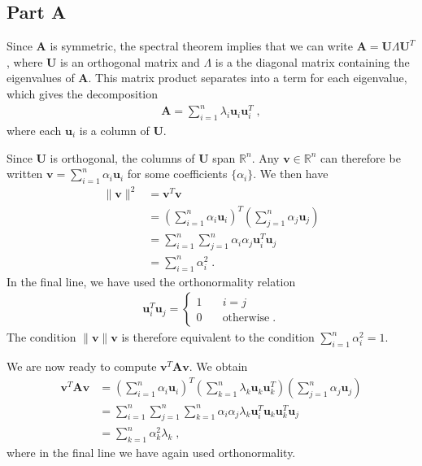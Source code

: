 \documentclass[11pt]{article}
\begin{document}

\subsection*{Part A}

Since $\mathbf{A}$ is symmetric, the spectral theorem implies that we can write $\mathbf{A} = \mathbf{U}\Lambda \mathbf{U}^T$, where $\mathbf{U}$ is an orthogonal matrix and $\Lambda$ is a the diagonal matrix containing the eigenvalues of $\mathbf{A}$. This matrix product separates into a term for each eigenvalue, which gives the decomposition
\begin{align*}
    \mathbf{A} = \sum_{i = 1}^n \lambda_i\mathbf{u}_i\mathbf{u}_i^T\;,
\end{align*}
where each $\mathbf{u}_i$ is a column of $\mathbf{U}$. 

Since $\mathbf{U}$ is orthogonal, the columns of $\mathbf{U}$ span $\mathbb{R}^n$. 
Any $\mathbf{v} \in \mathbb{R}^n$ can therefore be written $\mathbf{v} = \sum_{i = 1}^n \alpha_i \mathbf{u}_i$ for some coefficients $\{\alpha_i\}$. 
We then have 
\begin{align*}
    \lVert  \mathbf{v}\rVert^2 &= \mathbf{v}^T\mathbf{v} \\ 
    &= \left(\sum_{i = 1}^n \alpha_i \mathbf{u}_i \right)^T\left(\sum_{j = 1}^n  \alpha_j \mathbf{u}_j \right) \\ 
    &= \sum_{i = 1}^n\sum_{j = 1}^n \alpha_i \alpha_j \mathbf{u}_i^T \mathbf{u}_j \\ 
    &= \sum_{i = 1}^n \alpha_i^2\;.
\end{align*}
In the final line, we have used the orthonormality relation 
\begin{align*}
    \mathbf{u}_i^T\mathbf{u}_j = \begin{cases}
        1 &\quad i = j \\ 
        0 &\quad \text{otherwise}\;. 
    \end{cases}
\end{align*}
The condition $\lVert \mathbf{v} \rVert \mathbf{v}$ is therefore equivalent to the condition $\sum_{i = 1}^n \alpha_i^2 = 1$. 

We are now ready to compute $\mathbf{v}^T\mathbf{A}\mathbf{v}$. 
We obtain 
\begin{align*}
\mathbf{v}^T\mathbf{A}\mathbf{v} &= \left(\sum_{i = 1}^n \alpha_i \mathbf{u}_i \right)^T \left(\sum_{k = 1}^n \lambda_k\mathbf{u}_k\mathbf{u}_k^T\right) \left(\sum_{j = 1}^n  \alpha_j \mathbf{u}_j \right) \\ 
&= \sum_{i = 1}^n \sum_{j = 1}^n \sum_{k = 1}^n \alpha_i \alpha_j \lambda_k \mathbf{u}_i^T \mathbf{u}_k \mathbf{u}_k^T \mathbf{u}_j \\ 
&= \sum_{k = 1}^n \alpha_k^2 \lambda_k\;,
\end{align*}
where in the final line we have again used orthonormality. 
\end{document}
